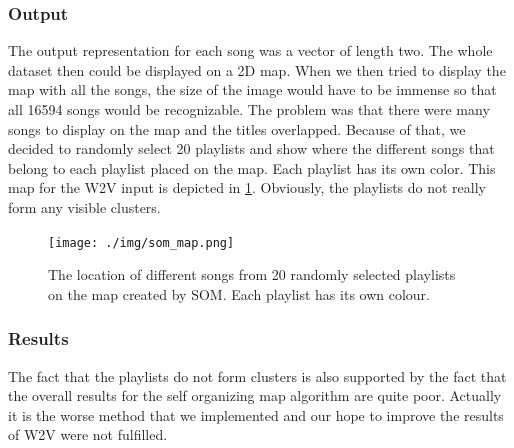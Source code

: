 \subsubsection{Output}
The output representation for each song was a vector of length two. The whole dataset then could be displayed on a 2D map. 
When we then tried to display the map with all the songs, the size of the image would have to be immense so that all 16594 songs would be recognizable. The problem was that there were many songs to display on the map and the titles overlapped. Because of that, we decided to randomly select 20 playlists and show where the different songs that belong to each playlist placed on the map. Each playlist has its own color. This map for the W2V input is depicted in \ref{fig:som_map}. Obviously, the playlists do not really form any visible clusters.
\begin{figure}[hbt!]
    \centering
	\texttt{[image: ./img/som\_map.png]}
	\caption{The location of different songs from 20 randomly selected playlists on the map created by SOM. Each playlist has its own colour.}
	\label{fig:som_map}
\end{figure}
\subsubsection{Results}
The fact that the playlists do not form clusters is also supported by the fact that the overall results for the self organizing map algorithm are quite poor. Actually it is the worse method that we implemented and our hope to improve the results of W2V were not fulfilled.

